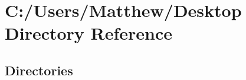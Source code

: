 \section{C\+:/\+Users/\+Matthew/\+Desktop Directory Reference}
\label{dir_b4a5a0ffdad34020d1c03d187c1e5b94}
\subsection*{Directories}
\begin{DoxyCompactItemize}
\end{DoxyCompactItemize}
